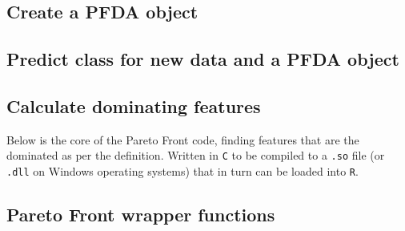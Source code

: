 \documentclass[12pt,a4paper,oneside]{report}
\begin{document}
\begin{appendix}
\subsection{Create a PFDA object}


\subsection{Predict class for new data and a PFDA object}





\subsection{Calculate dominating features} 
Below is the core of the Pareto Front code, finding features that are the dominated as per the definition. Written in {\tt C} to be compiled to a {\tt .so} file (or \texttt{.dll} on Windows operating systems) that in turn can be loaded into {\tt R}.\\


\subsection{Pareto Front wrapper functions} 



\end{appendix}
\end{document}
